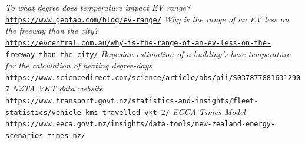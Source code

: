 \documentclass[
]{article}
\begin{document}
\begin{thebibliography}{9}
\textit{To what degree does temperature impact EV range?}
\\\texttt{\url{https://www.geotab.com/blog/ev-range/}}
\textit{Why is the range of an EV less on the freeway than the city?}
\\\texttt{\url{https://evcentral.com.au/why-is-the-range-of-an-ev-less-on-the-freeway-than-the-city/}}
\textit{Bayesian estimation of a building's base temperature for the calculation of heating degree-days}
\\\texttt{https://www.sciencedirect.com/science/article/abs/pii/S0378778816312907}
\textit{NZTA VKT data website}
\\\texttt{https://www.transport.govt.nz/statistics-and-insights/fleet-statistics/vehicle-kms-travelled-vkt-2/}
\textit{ECCA Times Model}
\\\texttt{https://www.eeca.govt.nz/insights/data-tools/new-zealand-energy-scenarios-times-nz/}
\end{thebibliography}
\end{document}
